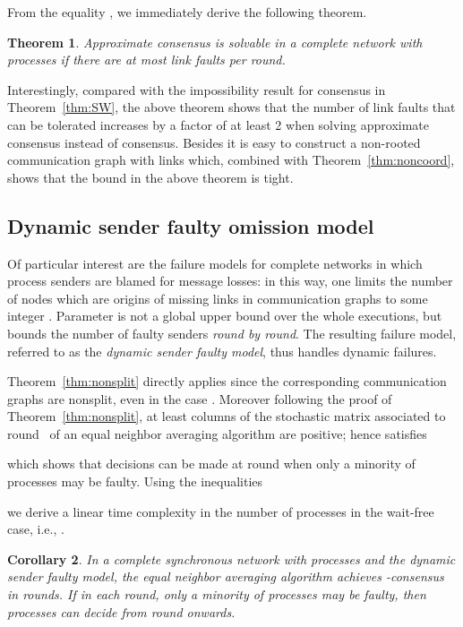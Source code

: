 \documentclass[a4paper]{article}
\theoremstyle{newthm}
\newtheorem{thm}{Theorem}
\newtheorem{cor}[thm]{Corollary}
\begin{document}
From the equality , we immediately derive the following theorem.

\begin{thm}\label{thm:2n-2}
Approximate consensus is solvable in a complete network with~ processes if
	there are at most  link faults per  round.
\end{thm}

Interestingly, compared with the impossibility result  for consensus  in Theorem~\ref{thm:SW},  
	the above theorem shows that the number of link faults that can be tolerated increases by a factor of at least 2 
	when solving  approximate consensus instead of consensus.
Besides  it is easy to construct a non-rooted communication graph with   links which,
	combined with Theorem~\ref{thm:noncoord},  shows that the bound in the above theorem is tight.

\subsection{Dynamic sender faulty omission model}

Of particular interest are the failure models for complete networks in which process senders are blamed for message
	losses: in this way, one limits  the number of nodes which are origins of
	missing links in  communication graphs to some integer  .
Parameter  is not a global upper bound over the whole executions, but bounds the number of faulty senders 
	{\em round by round}.
The resulting failure model, referred to as the {\em dynamic sender faulty model}, thus handles dynamic
	failures. 
	
Theorem~\ref{thm:nonsplit} directly applies since the corresponding communication graphs are nonsplit, 
	even in the case .
Moreover  following the proof of Theorem~\ref{thm:nonsplit}, at least  columns of the stochastic matrix 
	associated to round~ of an equal neighbor averaging algorithm are positive; hence  satisfies
	
	which shows that decisions can be made at round  when only a minority
	of processes may be faulty.
Using the inequalities
	
	we derive a linear time complexity in the number of processes in the wait-free case, i.e., .

\begin{cor}\label{cor:clean}
In a complete synchronous network with  processes and the dynamic sender faulty  model, 
	the equal neighbor averaging algorithm achieves -consensus in
	 rounds.
If in each round, only a minority of processes may be faulty, then processes can decide from  round
	 onwards. 
\end{cor}
	
\end{document}
